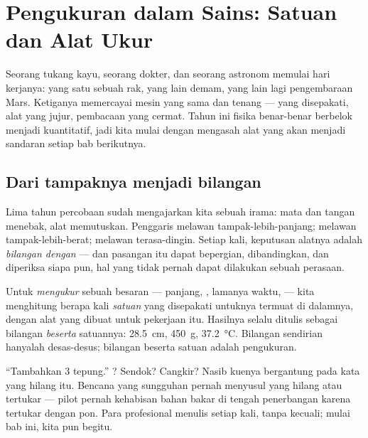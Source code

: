 \chapter{Pengukuran dalam Sains: Satuan dan Alat Ukur}\label{ch:g6:measurement-in-science}

Seorang tukang kayu, seorang dokter, dan seorang astronom memulai hari
kerjanya: yang satu  sebuah rak, yang lain demam, yang lain
lagi pengembaraan Mars. Ketiganya memercayai mesin yang sama dan
tenang ---  yang disepakati, alat yang jujur, pembacaan yang
cermat. Tahun ini fisika benar-benar berbelok menjadi kuantitatif,
jadi kita mulai dengan mengasah alat yang akan menjadi sandaran setiap
bab berikutnya.

\section{Dari tampaknya menjadi bilangan}

Lima tahun percobaan sudah mengajarkan kita sebuah irama: mata dan
tangan menebak, alat memutuskan. Penggaris melawan
tampak-lebih-panjang;  melawan tampak-lebih-berat; 
melawan terasa-dingin. Setiap kali, keputusan alatnya adalah
\emph{bilangan dengan } --- dan pasangan itu dapat bepergian,
dibandingkan, dan diperiksa siapa pun, hal yang tidak pernah dapat
dilakukan sebuah perasaan.

\begin{definition}\label{def:g6:measurement-in-science:measuring}
Untuk \emph{mengukur} sebuah besaran --- panjang,
, lamanya waktu,  --- kita menghitung berapa kali
\emph{satuan} yang disepakati untuknya termuat di
dalamnya, dengan alat yang dibuat untuk pekerjaan itu. Hasilnya selalu
ditulis sebagai bilangan \emph{beserta} satuannya: \qty{28.5}{cm},
\qty{450}{g}, \qty{37.2}{\celsius}. Bilangan sendirian hanyalah
desas-desus; bilangan beserta satuan adalah pengukuran.
\end{definition}

\begin{example}\label{ex:g6:measurement-in-science:missing}
``Tambahkan 3 tepung.'' ? Sendok? Cangkir? Nasib kuenya
bergantung pada kata yang hilang itu. Bencana yang sungguhan pernah
menyusul  yang hilang atau tertukar --- pilot pernah kehabisan
bahan bakar di tengah penerbangan karena  tertukar dengan pon.
Para profesional menulis  setiap kali, tanpa kecuali; mulai
bab ini, kita pun begitu.
\end{example}

